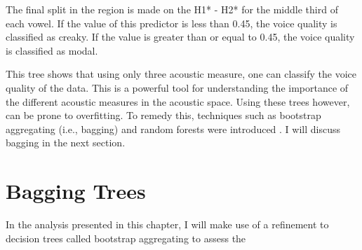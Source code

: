 The final split in the region is made on the H1* - H2* for the middle third of each vowel. If the value of this predictor is less than 0.45, the voice quality is classified as creaky. If the value is greater than or equal to 0.45, the voice quality is classified as modal.

This tree shows that using only three acoustic measure, one can classify the voice quality of the data. This is a powerful tool for understanding the importance of the different acoustic measures in the acoustic space. Using these trees however, can be prone to overfitting. To remedy this, techniques such as bootstrap aggregating (i.e., bagging) and random forests were introduced \citep{breimanBaggingPredictors1996,breimanRandomForests2001}. I will discuss bagging in the next section.

\section{Bagging Trees} \label{sec:bagging_bagging}

In the analysis presented in this chapter, I will make use of a refinement to decision trees called bootstrap aggregating \citep{breimanBaggingPredictors1996} to assess the
